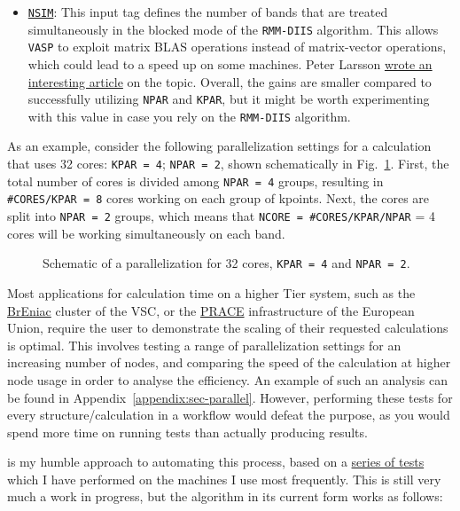 \begin{refsection}
\begin{itemize}
\item \href{https://cms.mpi.univie.ac.at/wiki/index.php/NSIM}{\texttt{NSIM}}: This input tag defines the number of bands that are treated simultaneously in the blocked mode of the \texttt{RMM-DIIS} algorithm. This allows \texttt{VASP} to exploit matrix BLAS operations instead of matrix-vector operations, which could lead to a speed up on some machines. Peter Larsson \href{https://www.nsc.liu.se/~pla/blog/2012/02/22/nparnsim/}{wrote an interesting article} on the topic. Overall, the gains are smaller compared to successfully utilizing \verb|NPAR| and \verb|KPAR|, but it might be worth experimenting with this value in case you rely on the \texttt{RMM-DIIS} algorithm.

\end{itemize}

As an example, consider the following parallelization settings for a calculation that uses 32 cores: \texttt{KPAR = 4}; \texttt{NPAR = 2}, shown schematically in Fig.~\ref{automation:fig-parallel}. First, the total number of cores is divided among \texttt{NPAR = 4} groups, resulting in \texttt{\#CORES/KPAR = 8} cores working on each group of kpoints. Next, the cores are split into \texttt{NPAR = 2} groups, which means that \texttt{NCORE = \#CORES/KPAR/NPAR} = 4 cores will be working simultaneously on each band.

\begin{figure}[hb]
\centering

\caption{Schematic of a parallelization for 32 cores, \texttt{KPAR = 4}  and \texttt{NPAR = 2}.}
\label{automation:fig-parallel}
\end{figure}

Most applications for calculation time on a higher Tier system, such as the \href{https://www.vscentrum.be/tier1}{BrEniac} cluster of the VSC, or the \href{http://www.prace-ri.eu/}{PRACE} infrastructure of the European Union, require the user to demonstrate the scaling of their requested calculations is optimal. This involves testing a range of parallelization settings for an increasing number of nodes, and comparing the speed of the calculation at higher node usage in order to analyse the efficiency. An example of such an analysis can be found in Appendix~\ref{appendix:sec-parallel}. However, performing these tests for every structure/calculation in a workflow would defeat the purpose, as you would spend more time on running tests than actually producing results. 

 is my humble approach to automating this process, based on a \href{https://mybinder.org/v2/gh/mbercx/jupyter/master?filepath=parallel\%2Fparallel_analysis.ipynb}{series of tests} which I have performed on the machines I use most frequently. This is still very much a work in progress, but the algorithm in its current form works as follows:


\end{refsection}
